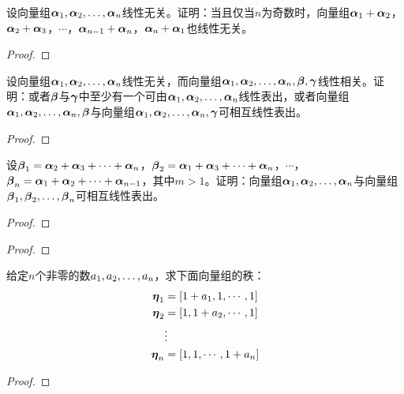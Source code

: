 \begin{problem}
设向量组\(\enums{\vecal}{n}\)线性无关。证明：当且仅当\(n\)为奇数时，向量组\(\vecal_1+\vecal_2\)，\(\vecal_2+\vecal_3\)，\(\cdots\)，\(\vecal_{n-1}+\vecal_n\)，\(\vecal_n+\vecal_1\)也线性无关。
\end{problem}
\begin{proof}

\end{proof}

\begin{problem}
设向量组\(\enums{\vecal}{n}\)线性无关，而向量组\(\enums{\vecal}{n},\vecbeta,\vecgamma\)线性相关。证明：或者\(\vecbeta\)与\(\vecgamma\)中至少有一个可由\(\enums{\vecal}{n}\)线性表出，或者向量组\(\enums{\vecal}{n},\vecbeta\)与向量组\(\enums{\vecal}{n},\vecgamma\)可相互线性表出。
\end{problem}
\begin{proof}

\end{proof}

\begin{problem}
设\(\vecbeta_1=\vecal_2+\vecal_3+\cdots+\vecal_{n}\)，\(\vecbeta_2=\vecal_1+\vecal_3+\cdots+\vecal_{n}\)，\(\cdots\)，\(\vecbeta_n=\vecal_1+\vecal_2+\cdots+\vecal_{n-1}\)，其中\(m>1\)。证明：向量组\(\enums{\vecal}{n}\)与向量组\(\enums{\vecbeta}{n}\)可相互线性表出。
\end{problem}
\begin{proof}

\end{proof}

\begin{problem}

\end{problem}
\begin{proof}

\end{proof}

\begin{problem}
给定\(n\)个非零的数\(\enums{a}{n}\)，求下面向量组的秩：
\begin{align*}
    \veceta_1 & =\mat{1+a_1,1,\cdots,1} \\
    \veceta_2 & =\mat{1,1+a_2,\cdots,1} \\
              & \vdots                  \\
    \veceta_n & =\mat{1,1,\cdots,1+a_n}
\end{align*}
\end{problem}
\begin{proof}

\end{proof}

